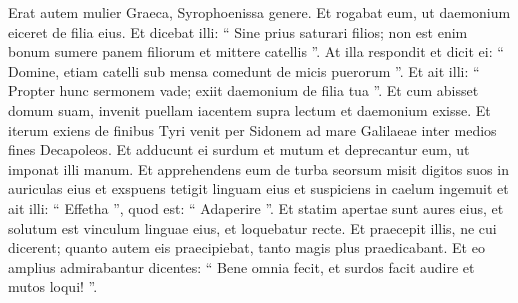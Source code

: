 \begin{biblechapter}
\begin{biblechapter}
\begin{biblechapter}
\begin{biblechapter}
\begin{biblechapter}
\begin{biblechapter}
\begin{biblechapter}
\verse Erat autem mulier Graeca, Syrophoenissa genere. Et rogabat eum, ut daemonium eiceret de filia eius. 
\verse Et dicebat illi: “ Sine prius saturari filios; non est enim bonum sumere panem filiorum et mittere catellis ”. 
\verse At illa respondit et dicit ei: “ Domine, etiam catelli sub mensa comedunt de micis puerorum ”. 
\verse Et ait illi: “ Propter hunc sermonem vade; exiit daemonium de filia tua ”. 
\verse Et cum abisset domum suam, invenit puellam iacentem supra lectum et daemonium exisse.
 \verse Et iterum exiens de finibus Tyri venit per Sidonem ad mare Galilaeae inter medios fines Decapoleos. 
\verse Et adducunt ei surdum et mutum et deprecantur eum, ut imponat illi manum. 
\verse Et apprehendens eum de turba seorsum misit digitos suos in auriculas eius et exspuens tetigit linguam eius 
\verse et suspiciens in caelum ingemuit et ait illi: “ Effetha ”, quod est: “ Adaperire ”. 
 \verse Et statim apertae sunt aures eius, et solutum est vinculum linguae eius, et loquebatur recte. 
\verse Et praecepit illis, ne cui dicerent; quanto autem eis praecipiebat, tanto magis plus praedicabant. 
\verse Et eo amplius admirabantur dicentes: “ Bene omnia fecit, et surdos facit audire et mutos loqui! ”.
 

\end{biblechapter}
\end{biblechapter}
\end{biblechapter}
\end{biblechapter}
\end{biblechapter}
\end{biblechapter}
\end{biblechapter}
